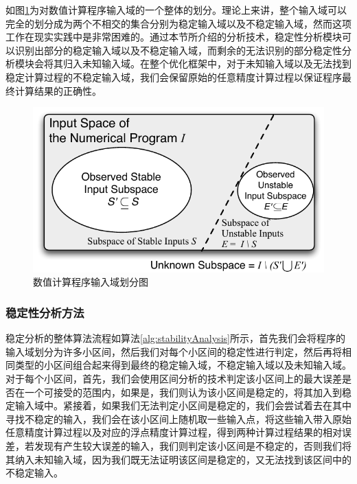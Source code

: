 如图\ref{fig:inputspace}为对数值计算程序输入域的一个整体的划分。理论上来讲，整个输入域可以完全的划分成为两个不相交的集合分别为稳定输入域以及不稳定输入域，然而这项工作在现实实践中是非常困难的。通过本节所介绍的分析技术，稳定性分析模块可以识别出部分的稳定输入域以及不稳定输入域，而剩余的无法识别的部分稳定性分析模块会将其归入未知输入域。在整个优化框架中，对于未知输入域以及无法找到稳定计算过程的不稳定输入域，我们会保留原始的任意精度计算过程以保证程序最终计算结果的正确性。

\begin{figure}[tb]
  \centering
  \includegraphics[width=\columnwidth]{fig/InputSpace.pdf}
  \vspace*{1mm}
  \caption{数值计算程序输入域划分图} \label{fig:inputspace} %
\end{figure}

\subsubsection{稳定性分析方法}

稳定分析的整体算法流程如算法\ref{alg:stabilityAnalysis}所示，首先我们会将程序的输入域划分为许多小区间，然后我们对每个小区间的稳定性进行判定，然后再将相同类型的小区间组合起来得到最终的稳定输入域，不稳定输入域以及未知输入域。对于每个小区间，首先，我们会使用区间分析的技术判定该小区间上的最大误差是否在一个可接受的范围内，如果是，我们则认为该小区间是稳定的，将其加入到稳定输入域中。紧接着，如果我们无法判定小区间是稳定的，我们会尝试着去在其中寻找不稳定的输入，我们会在该小区间上随机取一些输入点，将这些输入带入原始任意精度计算过程以及对应的浮点精度计算过程，得到两种计算过程结果的相对误差，若发现有产生较大误差的输入，我们则判定该小区间是不稳定的，否则我们将其纳入未知输入域，因为我们既无法证明该区间是稳定的，又无法找到该区间中的不稳定输入。

